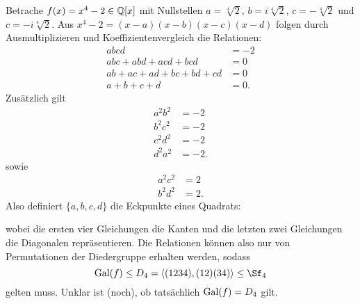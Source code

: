 \begin{beispiel}
Betrache $f(x) = x^4-2 \in \mathbb{Q}[x]$ mit Nullstellen $a = \sqrt[4]{2}$, $b= i \sqrt[4]{2}$, $c=- \sqrt[4]{2}$ und $c=-i \sqrt[4]{2}$. Aus $x^4-2= (x-a)(x-b)(x-c)(x-d)$ folgen durch Ausmultiplizieren und Koeffizientenvergleich die Relationen:
\begin{equation}
\begin{split}
abcd &= -2\\
abc+abd+acd+bcd &= 0 \\
ab+ac+ad+bc+bd+cd &= 0\\
a+b+c+d &= 0.
\end{split}
\end{equation}
Zusätzlich gilt
\begin{equation}
\begin{split}
a^2b^2 &= -2\\
b^2c^2 &= -2\\
c^2d^2 &= -2\\
d^2a^2 &= -2.
\end{split}
\end{equation}
sowie
\begin{equation}
\begin{split}
a^2c^2 &= 2\\
b^2d^2 &= 2.
\end{split}
\end{equation}
Also definiert $\{a,b,c,d\}$ die Eckpunkte eines Quadrats:
\begin{center}
\end{center}
wobei die ersten vier Gleichungen die Kanten und die letzten zwei Gleichungen die Diagonalen repräsentieren. Die Relationen können also nur von Permutationen der Diedergruppe erhalten werden, sodass 
\begin{equation}
\Gal (f) \leq D_4 = \langle (1234), (12)(34) \rangle \leq \Sf_4
\end{equation}
gelten muss. Unklar ist (noch), ob tatsächlich $\operatorname{\text{Gal}} (f) = D_4$ gilt.
\end{beispiel}
